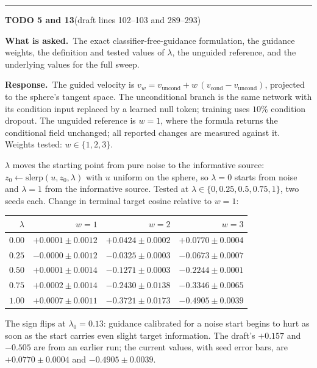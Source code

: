 \documentclass[11pt]{article}
\newenvironment{todoitem}[2]{%
  \par\medskip\noindent\rule{\textwidth}{0.7pt}\par\nobreak\smallskip
  \noindent\textbf{\large TODO #1}\quad\textnormal{\small(draft #2)}\par\nobreak\smallskip
}{\par\medskip}
\newcommand{\ask}[1]{\noindent\textbf{What is asked.}\ #1\par\smallskip}
\newcommand{\resp}[1]{\noindent\textbf{Response.}\ #1\par}
\begin{document}
\begin{todoitem}{5 and 13}{lines 102--103 and 289--293}
\ask{The exact classifier-free-guidance formulation, the guidance weights, the definition and
tested values of $\lambda$, the unguided reference, and the underlying values for the full sweep.}

\resp{The guided velocity is $v_w=v_{\text{uncond}}+w\,(v_{\text{cond}}-v_{\text{uncond}})$,
projected to the sphere's tangent space. The unconditional branch is the same network with its
condition input replaced by a learned null token; training uses $10\%$ condition dropout.
The unguided reference is $w=1$, where the formula returns the conditional field unchanged; all
reported changes are measured against it. Weights tested: $w\in\{1,2,3\}$.

$\lambda$ moves the starting point from pure noise to the informative source:
$z_0\leftarrow\mathrm{slerp}(u,z_0,\lambda)$ with $u$ uniform on the sphere, so $\lambda=0$ starts
from noise and $\lambda=1$ from the informative source. Tested at
$\lambda\in\{0,0.25,0.5,0.75,1\}$, two seeds each. Change in terminal target cosine relative to
$w=1$:

\begin{center}
\small
\begin{tabular}{@{}rrrr@{}}
\toprule
$\lambda$ & $w=1$ & $w=2$ & $w=3$\\
\midrule
$0.00$ & $+0.0001\pm0.0012$ & $+0.0424\pm0.0002$ & $+0.0770\pm0.0004$\\
$0.25$ & $-0.0000\pm0.0012$ & $-0.0325\pm0.0003$ & $-0.0673\pm0.0007$\\
$0.50$ & $+0.0001\pm0.0014$ & $-0.1271\pm0.0003$ & $-0.2244\pm0.0001$\\
$0.75$ & $+0.0002\pm0.0014$ & $-0.2430\pm0.0138$ & $-0.3346\pm0.0065$\\
$1.00$ & $+0.0007\pm0.0011$ & $-0.3721\pm0.0173$ & $-0.4905\pm0.0039$\\
\bottomrule
\end{tabular}
\end{center}

The sign flips at $\lambda_0=0.13$: guidance calibrated for a noise start begins to hurt as soon
as the start carries even slight target information. The draft's $+0.157$ and $-0.505$ are from
an earlier run; the current values, with seed error bars, are $+0.0770\pm0.0004$ and
$-0.4905\pm0.0039$.}
\end{todoitem}
\end{document}
